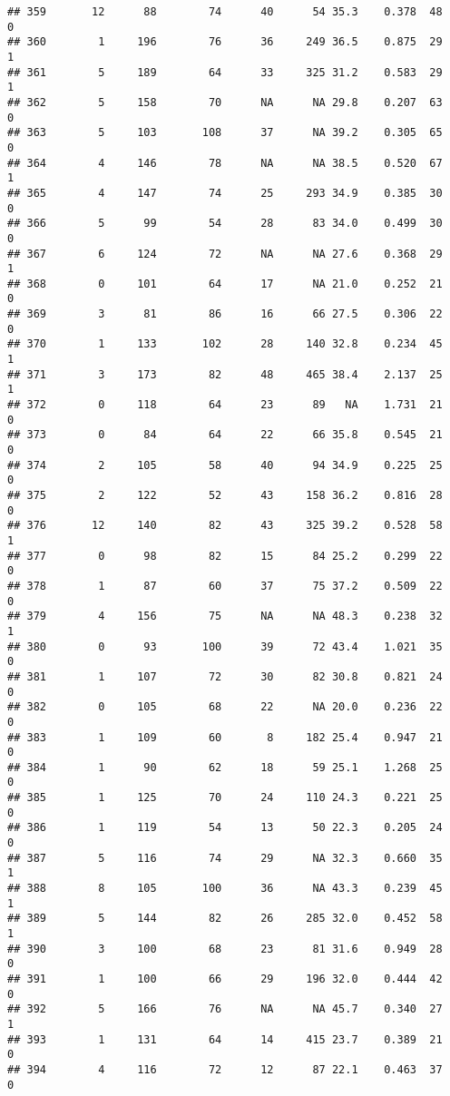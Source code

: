 \documentclass[
]{article}
\begin{document}
\begin{verbatim}
## 359       12      88        74      40      54 35.3    0.378  48    0
## 360        1     196        76      36     249 36.5    0.875  29    1
## 361        5     189        64      33     325 31.2    0.583  29    1
## 362        5     158        70      NA      NA 29.8    0.207  63    0
## 363        5     103       108      37      NA 39.2    0.305  65    0
## 364        4     146        78      NA      NA 38.5    0.520  67    1
## 365        4     147        74      25     293 34.9    0.385  30    0
## 366        5      99        54      28      83 34.0    0.499  30    0
## 367        6     124        72      NA      NA 27.6    0.368  29    1
## 368        0     101        64      17      NA 21.0    0.252  21    0
## 369        3      81        86      16      66 27.5    0.306  22    0
## 370        1     133       102      28     140 32.8    0.234  45    1
## 371        3     173        82      48     465 38.4    2.137  25    1
## 372        0     118        64      23      89   NA    1.731  21    0
## 373        0      84        64      22      66 35.8    0.545  21    0
## 374        2     105        58      40      94 34.9    0.225  25    0
## 375        2     122        52      43     158 36.2    0.816  28    0
## 376       12     140        82      43     325 39.2    0.528  58    1
## 377        0      98        82      15      84 25.2    0.299  22    0
## 378        1      87        60      37      75 37.2    0.509  22    0
## 379        4     156        75      NA      NA 48.3    0.238  32    1
## 380        0      93       100      39      72 43.4    1.021  35    0
## 381        1     107        72      30      82 30.8    0.821  24    0
## 382        0     105        68      22      NA 20.0    0.236  22    0
## 383        1     109        60       8     182 25.4    0.947  21    0
## 384        1      90        62      18      59 25.1    1.268  25    0
## 385        1     125        70      24     110 24.3    0.221  25    0
## 386        1     119        54      13      50 22.3    0.205  24    0
## 387        5     116        74      29      NA 32.3    0.660  35    1
## 388        8     105       100      36      NA 43.3    0.239  45    1
## 389        5     144        82      26     285 32.0    0.452  58    1
## 390        3     100        68      23      81 31.6    0.949  28    0
## 391        1     100        66      29     196 32.0    0.444  42    0
## 392        5     166        76      NA      NA 45.7    0.340  27    1
## 393        1     131        64      14     415 23.7    0.389  21    0
## 394        4     116        72      12      87 22.1    0.463  37    0

\end{verbatim}
\end{document}
